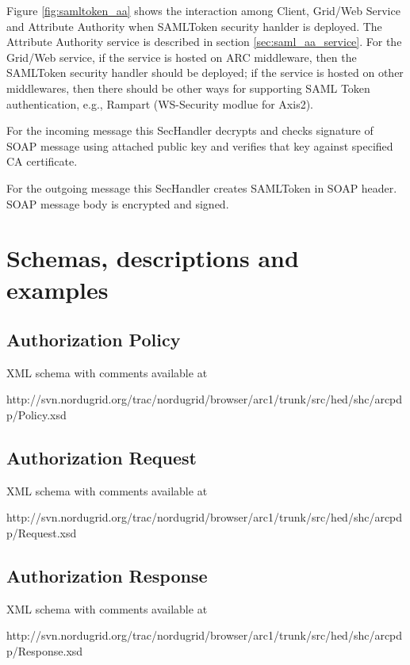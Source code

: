 \documentclass{article}                            %
\begin{document}
Figure \ref{fig:samltoken_aa} shows the interaction among Client, Grid/Web Service and Attribute Authority when SAMLToken security hanlder is deployed. The Attribute Authority service is described in section \ref{sec:saml_aa_service}. For the Grid/Web service, if the service is hosted on ARC middleware, then the SAMLToken security handler should be deployed; if the service is hosted on other middlewares, then there should be other ways for supporting SAML Token authentication, e.g., Rampart (WS-Security modlue for Axis2).

For the incoming message this SecHandler decrypts and checks signature of SOAP message using attached public key and verifies that key against specified CA certificate.

For the outgoing message this SecHandler creates SAMLToken in SOAP header. SOAP message body is encrypted and signed.




\section{Schemas, descriptions and examples} %
\label{sec:schema_description_example}

\subsection{Authorization Policy} %
\label{subsec:authz_policy}
XML schema with comments available at

http://svn.nordugrid.org/trac/nordugrid/browser/arc1/trunk/src/hed/shc/arcpdp/Policy.xsd

\subsection{Authorization Request} %
\label{subsec:authz_request}
XML schema with comments available at

http://svn.nordugrid.org/trac/nordugrid/browser/arc1/trunk/src/hed/shc/arcpdp/Request.xsd


\subsection{Authorization Response} %
\label{subsec:authz_response}
XML schema with comments available at

http://svn.nordugrid.org/trac/nordugrid/browser/arc1/trunk/src/hed/shc/arcpdp/Response.xsd
\end{document}
